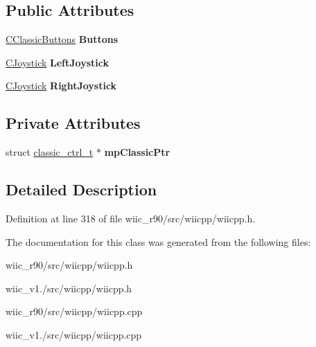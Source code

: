 \subsection*{Public Attributes}
\begin{DoxyCompactItemize}
\item 
\hypertarget{class_c_classic_a1592d3c639fa90e657cc3c3f741363b8}{\hyperlink{class_c_classic_buttons}{C\-Classic\-Buttons} {\bfseries Buttons}}\label{class_c_classic_a1592d3c639fa90e657cc3c3f741363b8}

\item 
\hypertarget{class_c_classic_a3469e965eac46db5ecc669d74d8a2420}{\hyperlink{class_c_joystick}{C\-Joystick} {\bfseries Left\-Joystick}}\label{class_c_classic_a3469e965eac46db5ecc669d74d8a2420}

\item 
\hypertarget{class_c_classic_a65a96a9397c278e0bc5e7f5b7048d855}{\hyperlink{class_c_joystick}{C\-Joystick} {\bfseries Right\-Joystick}}\label{class_c_classic_a65a96a9397c278e0bc5e7f5b7048d855}

\end{DoxyCompactItemize}
\subsection*{Private Attributes}
\begin{DoxyCompactItemize}
\item 
\hypertarget{class_c_classic_a0d5c9285e0d218450e8b10dcf7935bd7}{struct \hyperlink{structclassic__ctrl__t}{classic\-\_\-ctrl\-\_\-t} $\ast$ {\bfseries mp\-Classic\-Ptr}}\label{class_c_classic_a0d5c9285e0d218450e8b10dcf7935bd7}

\end{DoxyCompactItemize}


\subsection{Detailed Description}


Definition at line 318 of file wiic\-\_\-r90/src/wiicpp/wiicpp.\-h.



The documentation for this class was generated from the following files\-:\begin{DoxyCompactItemize}
\item 
wiic\-\_\-r90/src/wiicpp/wiicpp.\-h\item 
wiic\-\_\-v1./src/wiicpp/wiicpp.\-h\item 
wiic\-\_\-r90/src/wiicpp/wiicpp.\-cpp\item 
wiic\-\_\-v1./src/wiicpp/wiicpp.\-cpp\end{DoxyCompactItemize}
